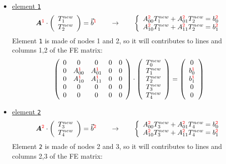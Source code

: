 \begin{itemize}
\item \underline{element {\color{red}\tt 1}} 
\[
{\bm A}^{\color{red} \tt 1}  \cdot 
\left(
\begin{array}{c}
T_1^{new} \\ T_2^{new}
\end{array}
\right)
 =  {\vec b}^{\color{red} \tt 1}
\qquad
\rightarrow
\qquad
\left\{ 
\begin{array}{l}
A_{00}^{{\color{red}\tt 2}} T_1^{new} + A_{01}^{{\color{red}\tt 2}} T_2^{new} = b^{{\color{red} \tt 2}}_0 \\
A_{10}^{{\color{red}\tt 2}} T_1^{new} + A_{11}^{{\color{red}\tt 2}} T_2^{new} = b^{{\color{red} \tt 2}}_1
\end{array}
\right.
\]
Element {\color{red}\tt 1} is made of nodes 1 and 2, so it will contributes to lines and columns 1,2 of the FE matrix:
\[
\left( \begin{array}{ccccc}
0 & 0 & 0 & 0 & 0 \\ 
0 & A_{00}^{{\color{red}\tt 1}} &  A_{01}^{{\color{red}\tt 1}} &0&0 \\ 
0 & A_{10}^{{\color{red}\tt 1}} &  A_{11}^{{\color{red}\tt 1}}    &0&0 \\
0 & 0 & 0 & 0 & 0 \\ 
0 & 0 & 0 & 0 & 0 
\end{array} \right) \cdot
\left(\begin{array}{c}
T_0^{new} \\ T_1^{new} \\ T_2^{new} \\ T_3^{new} \\ T_4^{new}
\end{array} \right)
=
\left(\begin{array}{c}
0 \\ b_{0}^{{\color{red}\tt 1}} \\  b_{1}^{{\color{red}\tt 1}} \\  0 \\  0 
\end{array}\right)
\]



\item \underline{element {\color{red}\tt 2}}
\[
{\bm A}^{\color{red} \tt 2}  \cdot 
\left(
\begin{array}{c}
T_3^{new} \\ T_4^{new}
\end{array}
\right)
 =  {\vec b}^{\color{red} \tt 2}
\qquad
\rightarrow
\qquad
\left\{ 
\begin{array}{l}
A_{00}^{{\color{red}\tt 2}} T_3^{new} + A_{01}^{{\color{red} \tt 2}} T_4^{new} = b^{{\color{red} \tt 2}}_0 \\
A_{10}^{{\color{red}\tt 2}} T_3^{new} + A_{11}^{{\color{red} \tt 2}} T_4^{new} = b^{{\color{red} \tt 2}}_1
\end{array}
\right.
\]
Element {\color{red}\tt 2} is made of nodes 2 and 3, so it will contributes to lines and columns 2,3 of the FE matrix:



\end{itemize}
